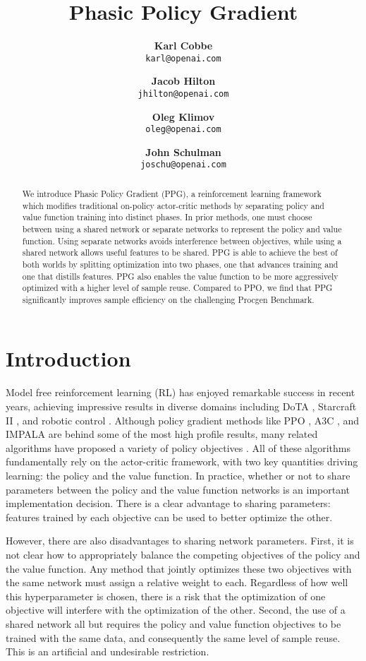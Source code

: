 \documentclass{article}
\title{{\Large Phasic Policy Gradient}}
\author{
  \small \textbf{\scriptsize Karl Cobbe}\\
  \small \texttt{\scriptsize karl@openai.com}
  \and
  \small \textbf{\scriptsize Jacob Hilton}\\
  \small \texttt{\scriptsize jhilton@openai.com}
  \and
  \small \textbf{\scriptsize Oleg Klimov}\\
  \small \texttt{\scriptsize oleg@openai.com}
  \and
  \small \textbf{\scriptsize John Schulman}\\
  \small \texttt{\scriptsize joschu@openai.com}
}
\date{}
\begin{document}
\maketitle

\begin{abstract}

We introduce Phasic Policy Gradient (PPG), a reinforcement learning framework which modifies traditional on-policy actor-critic methods by separating policy and value function training into distinct phases. In prior methods, one must choose between using a shared network or separate networks to represent the policy and value function. Using separate networks avoids interference between objectives, while using a shared network allows useful features to be shared. PPG is able to achieve the best of both worlds by splitting optimization into two phases, one that advances training and one that distills features. PPG also enables the value function to be more aggressively optimized with a higher level of sample reuse. Compared to PPO, we find that PPG significantly improves sample efficiency on the challenging Procgen Benchmark.

\end{abstract}

\section{Introduction}

Model free reinforcement learning (RL) has enjoyed remarkable success in recent years, achieving impressive results in diverse domains including DoTA \citep{dota}, Starcraft II \citep{starcraft}, and robotic control \citep{rubiks}. Although policy gradient methods like PPO \citep{ppo}, A3C \citep{mnih2016asynchronous}, and IMPALA \citep{impala} are behind some of the most high profile results, many related algorithms have proposed a variety of policy objectives \citep{trpo, acktr, awr, vmpo, ddpg, sac}. All of these algorithms fundamentally rely on the actor-critic framework, with two key quantities driving learning: the policy and the value function. In practice, whether or not to share parameters between the policy and the value function networks is an important implementation decision. There is a clear advantage to sharing parameters: features trained by each objective can be used to better optimize the other.

However, there are also disadvantages to sharing network parameters. First, it is not clear how to appropriately balance the competing objectives of the policy and the value function. Any method that jointly optimizes these two objectives with the same network must assign a relative weight to each. Regardless of how well this hyperparameter is chosen, there is a risk that the optimization of one objective will interfere with the optimization of the other. Second, the use of a shared network all but requires the policy and value function objectives to be trained with the same data, and consequently the same level of sample reuse. This is an artificial and undesirable restriction.
\end{document}
